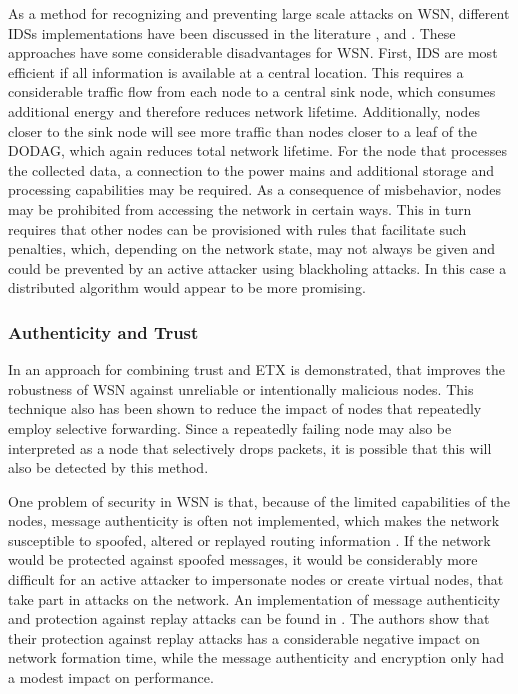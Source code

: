 \documentclass[
  a4paper,
  11pt,
  style=screen,
  extramargin,
  bcor=10mm,
  rgb,
  hyperrefdark,
  abstract=off,
  lnum,
]{tubsartcl}
\begin{document}
As a method for recognizing and preventing large scale attacks on \ac{WSN}, different \acp{IDS} implementations have been discussed in the literature \cite{le2011specification}, \cite{raza2013svelte} and \cite{kasinathan2013denial}.
These approaches have some considerable disadvantages for \ac{WSN}.
First, \ac{IDS} are most efficient if all information is available at a central location.
This requires a considerable traffic flow from each node to a central sink node, which consumes additional energy and therefore reduces network lifetime.
Additionally, nodes closer to the sink node will see more traffic than nodes closer to a leaf of the \ac{DODAG}, which again reduces total network lifetime.
For the node that processes the collected data, a connection to the power mains and additional storage and processing capabilities may be required.
As a consequence of misbehavior, nodes may be prohibited from accessing the network in certain ways.
This in turn requires that other nodes can be provisioned with rules that facilitate such penalties, which, depending on the network state, may not always be given and could be prevented by an active attacker using blackholing attacks.
In this case a distributed algorithm would appear to be more promising.

\subsubsection{Authenticity and Trust}

In \cite{kantert2016combining} an approach for combining trust and \ac{ETX} is demonstrated, that improves the robustness of \ac{WSN} against unreliable or intentionally malicious nodes.
This technique also has been shown to reduce the impact of nodes that repeatedly employ selective forwarding.
Since a repeatedly failing node may also be interpreted as a node that selectively drops packets, it is possible that this will also be detected by this method.

One problem of security in \ac{WSN} is that, because of the limited capabilities of the nodes, message authenticity is often not implemented, which makes the network susceptible to spoofed, altered or replayed routing information \cite{karlof2003secure}.
If the network would be protected against spoofed messages, it would be considerably more difficult for an active attacker to impersonate nodes or create virtual nodes, that take part in attacks on the network.
An implementation of message authenticity and protection against replay attacks can be found in \cite{perazzo2017implementation}.
The authors show that their protection against replay attacks has a considerable negative impact on network formation time, while the message authenticity and encryption only had a modest impact on performance.
\end{document}
